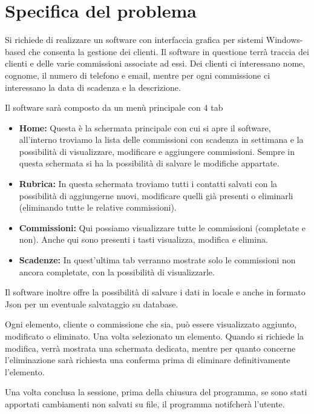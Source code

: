 \section{Specifica del problema}
Si richiede di realizzare un software con interfaccia grafica per sistemi Windows-based che consenta la gestione dei clienti. Il software in questione terrà traccia dei clienti e delle varie commissioni
associate ad essi. Dei clienti ci interessano nome, cognome, il numero di telefono e email, mentre per ogni commissione ci interessano
la data di scadenza e la descrizione.

Il software sarà composto da un menù principale con 4 tab 
\begin{itemize}
        \item \textbf{Home:} Questa è la schermata principale con cui si apre il software, all'interno
        troviamo la lista delle commissioni con scadenza in settimana e la possibilità di visualizzare, modificare
        e aggiungere commissioni. Sempre in questa schermata si ha la possibilità di salvare le modifiche appartate.
        \item \textbf{Rubrica:} In questa schermata troviamo tutti i contatti salvati con la possibilità di aggiungerne nuovi, 
        modificare quelli già presenti o eliminarli (eliminando tutte le relative commissioni).
        \item \textbf{Commissioni:} Qui possiamo visualizzare tutte le commissioni (completate e non). Anche qui sono presenti i tasti 
        visualizza, modifica e elimina.
        \item \textbf{Scadenze:} In quest'ultima tab verranno mostrate solo le commissioni non ancora completate, con la possibilità di visualizzarle.

\end{itemize}


\medskip
Il software inoltre offre la possibilità di salvare i dati in locale e anche in formato Json per un eventuale
salvataggio su database.




\medskip
Ogni elemento, cliente o commissione che sia, può essere visualizzato aggiunto, modificato o eliminato.
Una volta selezionato un elemento.
Quando si richiede la modifica, verrà mostrata una schermata dedicata, mentre per quanto concerne l'eliminazione  
sarà richiesta una conferma prima di eliminare definitivamente l'elemento.

\medskip
Una volta conclusa la sessione, prima della chiusura del programma, se sono stati apportati cambiamenti non salvati su file,
il programma notifcherà l'utente. 